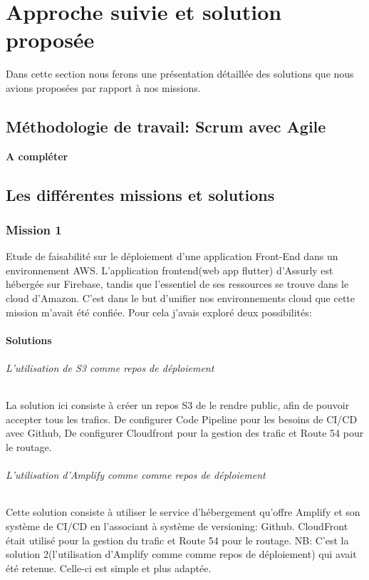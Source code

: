 
\chapter{Approche suivie et solution proposée} %

\label{Chaptre4} %

Dans cette section nous ferons une présentation détaillée des solutions que nous avions proposées par rapport à nos missions.



\section{Méthodologie de travail: Scrum avec Agile}
\textbf{A compléter}
\section{Les différentes missions et solutions}
\subsection{Mission 1}
Etude de faisabilité sur le déploiement d’une application Front-End dans un environnement AWS.
L’application frontend(web app flutter) d’Assurly est hébergée sur Firebase, tandis que l’essentiel de
ses ressources se trouve dans le cloud d’Amazon. C’est dans le but d’unifier nos environnements cloud que
cette mission m’avait été confiée.
Pour cela j’avais exploré deux possibilités:
\subsubsection{Solutions}
\subparagraph{L’utilisation de S3 comme repos de déploiement}
La solution ici consiste à créer un repos S3 de le rendre public, afin de pouvoir accepter tous les trafics.
De configurer Code Pipeline pour les besoins de CI/CD avec Github, De configurer Cloudfront pour la
gestion des trafic et Route 54 pour le routage.
\subparagraph{L’utilisation d’Amplify comme comme repos de déploiement}
Cette solution consiste à utiliser le service d’hébergement qu’offre Amplify et son système de CI/CD en
l’associant à système de versioning: Github. CloudFront était utilisé pour la gestion du trafic et Route 54
pour le routage.
NB: C’est la solution 2(l’utilisation d’Amplify comme comme repos de déploiement) qui avait été
retenue. Celle-ci est simple et plus adaptée.
